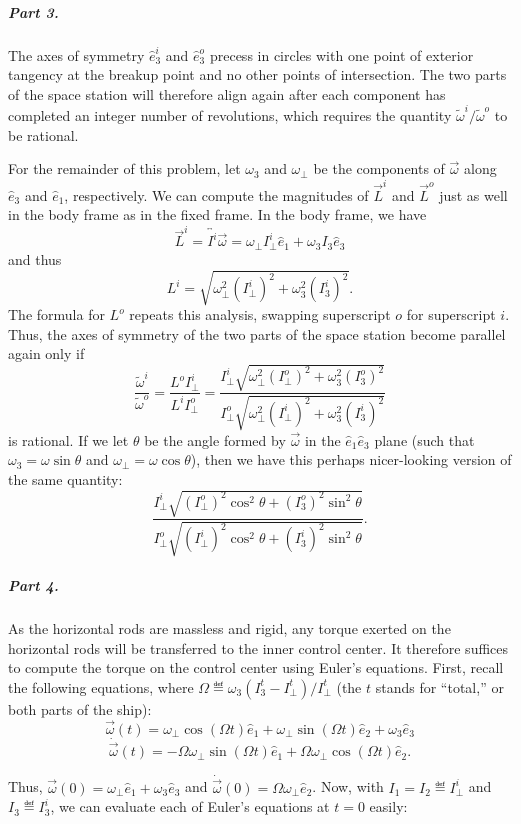 \subparagraph{Part 3.}

The axes of symmetry $\hat{e}_3^i$ and $\hat{e}_3^o$ precess in circles with one point of exterior tangency at the breakup point and no other points of intersection.  The two parts of the space station will therefore align again after each component has completed an integer number of revolutions, which requires the quantity $\tilde{\omega}^i / \tilde{\omega}^o$ to be rational.

For the remainder of this problem, let $\omega_3$ and $\omega_\bot$ be the components of $\vec{\omega}$ along $\hat{e}_3$ and $\hat{e}_1$, respectively.  We can compute the magnitudes of $\vec{L}^i$ and $\vec{L}^o$ just as well in the body frame as in the fixed frame.  In the body frame, we have $$\vec{L}^i = \overleftrightarrow{I^i}\vec{\omega} = \omega_\bot I^i_\bot \hat{e}_1 + \omega_3 I_3 \hat{e}_3$$ and thus $$L^i = \sqrt{\omega_\bot^2 (I_\bot^i)^2 + \omega_3^2 (I_3^i)^2}.$$  The formula for $L^o$ repeats this analysis, swapping superscript $o$ for superscript $i$.  Thus, the axes of symmetry of the two parts of the space station become parallel again only if $$\frac{\tilde{\omega}^i}{\tilde{\omega}^o} = \frac{L^o I^i_\bot}{L^i I^o_\bot} = \frac{I^i_\bot \sqrt{\omega_\bot^2 (I_\bot^o)^2 + \omega_3^2 (I_3^o)^2}}{I^o_\bot \sqrt{\omega_\bot^2 (I_\bot^i)^2 + \omega_3^2 (I_3^i)^2}}$$ is rational.  If we let $\theta$ be the angle formed by $\vec{\omega}$ in the $\hat{e}_1 \hat{e}_3$ plane (such that $\omega_3 = \omega \sin \theta$ and $\omega_\bot = \omega \cos \theta$), then we have this perhaps nicer-looking version of the same quantity: $$\frac{I^i_\bot \sqrt{(I^o_\bot )^2 \cos^2 \theta + (I^o_3)^2 \sin^2 \theta}}{I^o_\bot \sqrt{(I^i_\bot)^2 \cos^2 \theta + (I^i_3)^2 \sin^2 \theta}}.$$

\subparagraph{Part 4.}  As the horizontal rods are massless and rigid, any torque exerted on the horizontal rods will be transferred to the inner control center.  It therefore suffices to compute the torque on the control center using Euler's equations.  First, recall the following equations, where $\Omega \eqdef \omega_3 (I_3^t - I_\bot^t)/I_\bot^t$ (the $t$ stands for ``total,'' or both parts of the ship): $$\vec{\omega}(t) = \omega_\bot \cos (\Omega t) \hat{e}_1 + \omega_\bot \sin (\Omega t) \hat{e}_2 + \omega_3 \hat{e}_3$$  $$\dot{\vec{\omega}}(t) = - \Omega \omega_\perp \sin (\Omega t) \hat{e}_1 + \Omega \omega_\perp \cos (\Omega t) \hat{e}_2.$$

Thus, $\vec{\omega}(0) = \omega_\perp  \hat{e}_1 + \omega_3 \hat{e}_3$ and $\dot{\vec{\omega}}(0) = \Omega \omega_\perp \hat{e}_2$.  Now, with $I_1 = I_2 \eqdef I_\perp^i$ and $I_3 \eqdef I_3^i$, we can evaluate each of Euler's equations at $t = 0$ easily:

